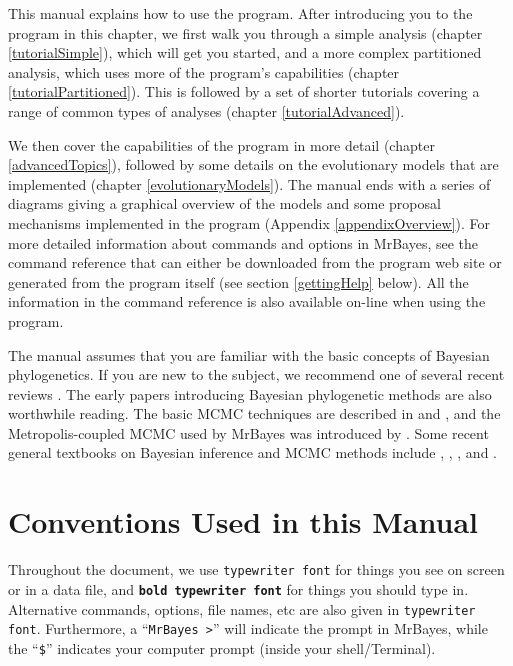 \documentclass[12pt]{book}
\newcommand{\ttt}[1]{\texttt{#1}}
\newcommand{\tb}[1]{\ttt{\textbf{#1}}}
\begin{document}
This manual explains how to use the program. After introducing you to the program in this chapter,
we first walk you through a simple analysis (chapter \ref{tutorialSimple}), which will get you
started, and a more complex partitioned analysis, which uses more of the program's capabilities
(chapter \ref{tutorialPartitioned}). This is followed by a set of shorter tutorials covering a
range of common types of analyses (chapter \ref{tutorialAdvanced}).

We then cover the capabilities of the program in more detail (chapter \ref{advancedTopics}),
followed by some details on the evolutionary models that are implemented (chapter
\ref{evolutionaryModels}). The manual ends with a series of diagrams giving a graphical overview of
the models and some proposal mechanisms implemented in the program (Appendix
\ref{appendixOverview}). For more detailed information about commands and options in MrBayes, see
the command reference that can either be downloaded from the program web site or generated from the
program itself (see section \ref{gettingHelp} below). All the information in the command reference
is also available on-line when using the program.

The manual assumes that you are familiar with the basic concepts of Bayesian phylogenetics. If you
are new to the subject, we recommend one of several recent reviews \citep{lewis01, holder03,
ronquist10}. The early papers introducing Bayesian phylogenetic methods \citep{li96, mau96,
rannala96, mau97, larget99, mau99, newton99} are also worthwhile reading. The basic MCMC techniques
are described in \citet{metropolis53} and \citet{hastings70}, and the Metropolis-coupled MCMC used
by MrBayes was introduced by \citet{geyer91}. Some recent general textbooks on Bayesian inference
and MCMC methods include \citet{gilks96a}, \citet{carlin00}, \citet{gelman03}, and
\citet{gamerman06}.

\section{Conventions Used in this Manual}

Throughout the document, we use \texttt{typewriter font} for things you see on screen or in a data
file, and \tb{bold typewriter font} for things you should type in. Alternative commands, options,
file names, etc are also given in \texttt{typewriter font}. Furthermore, a ``\texttt{MrBayes >}''
will indicate the prompt in MrBayes, while the ``\texttt{\$}'' indicates your computer prompt
(inside your shell/Terminal).
\end{document}
